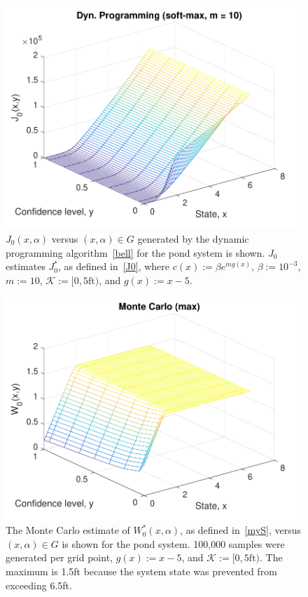 \documentclass[letterpaper, 10 pt, conference]{ieeeconf}  %
\begin{document}
\begin{figure}[thpb]
      \centering
      \includegraphics[scale=0.5]{dyn_prog_J0_sept112018.pdf}
      \caption{$J_0(x,\alpha)$ versus $(x, \alpha) \in G$ generated by the dynamic programming algorithm~\eqref{bell} for the pond system is shown.
	  $J_0$ estimates $J_0^*$, as defined in~\eqref{J0}, where $c(x) := \beta e^{m g(x)}$, $\beta := 10^{-3}$, $m := 10$, $\mathcal{K} := [0, 5\text{ft})$, and $g(x) := x-5$.}
      \label{J0dp}
\end{figure}

\begin{figure}[thpb]
      \centering
      \includegraphics[scale=0.5]{monte_carlo_max_sept112018.pdf}
      \caption{The Monte Carlo estimate of $W_0^*(x,\alpha)$, as defined in~\eqref{myS}, versus $(x, \alpha) \in G$ is shown for the pond system.
	  100,000 samples were generated per grid point, $g(x) := x - 5$, and $\mathcal{K} := [0, 5\text{ft})$. 
	  The maximum is 1.5ft because the system state was prevented from exceeding 6.5ft.}
      \label{W0mc}
\end{figure}
\end{document}
